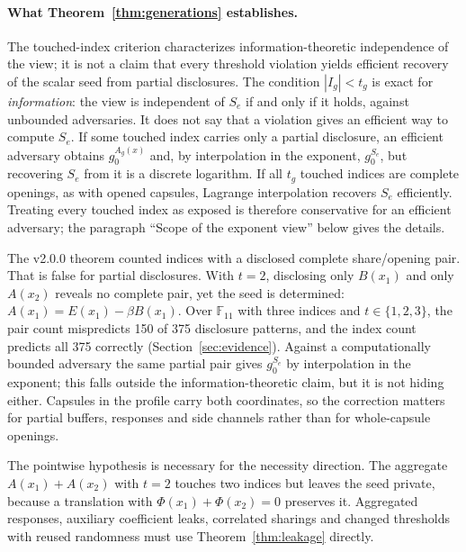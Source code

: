 \documentclass[pdflatex,sn-mathphys-num,twocolumn]{sn-jnl}
\theoremstyle{plain}
\theoremstyle{definition}
\newcommand{\F}{\mathbb{F}}
\begin{document}
\paragraph{What Theorem~\ref{thm:generations} establishes.}
The touched-index criterion characterizes information-theoretic independence of the view; it is not a claim that every threshold violation yields efficient recovery of the scalar seed from partial disclosures. The condition $|I_g|<t_g$ is exact for \emph{information}: the view is independent of $S_e$ if and only if it holds, against unbounded adversaries. It does not say that a violation gives an efficient way to compute $S_e$. If some touched index carries only a partial disclosure, an efficient adversary obtains $g_0^{A_g(x)}$ and, by interpolation in the exponent, $g_0^{S_e}$, but recovering $S_e$ from it is a discrete logarithm. If all $t_g$ touched indices are complete openings, as with opened capsules, Lagrange interpolation recovers $S_e$ efficiently. Treating every touched index as exposed is therefore conservative for an efficient adversary; the paragraph ``Scope of the exponent view'' below gives the details.

The v2.0.0 theorem counted indices with a disclosed complete share/opening pair. That is false for partial disclosures. With $t=2$, disclosing only $B(x_1)$ and only $A(x_2)$ reveals no complete pair, yet the seed is determined: $A(x_1)=E(x_1)-\beta B(x_1)$. Over $\F_{11}$ with three indices and $t\in\{1,2,3\}$, the pair count mispredicts 150 of 375 disclosure patterns, and the index count predicts all 375 correctly (Section~\ref{sec:evidence}). Against a computationally bounded adversary the same partial pair gives $g_0^{S_e}$ by interpolation in the exponent; this falls outside the information-theoretic claim, but it is not hiding either. Capsules in the profile carry both coordinates, so the correction matters for partial buffers, responses and side channels rather than for whole-capsule openings.

The pointwise hypothesis is necessary for the necessity direction. The aggregate $A(x_1)+A(x_2)$ with $t=2$ touches two indices but leaves the seed private, because a translation with $\Phi(x_1)+\Phi(x_2)=0$ preserves it. Aggregated responses, auxiliary coefficient leaks, correlated sharings and changed thresholds with reused randomness must use Theorem~\ref{thm:leakage} directly.
\end{document}
